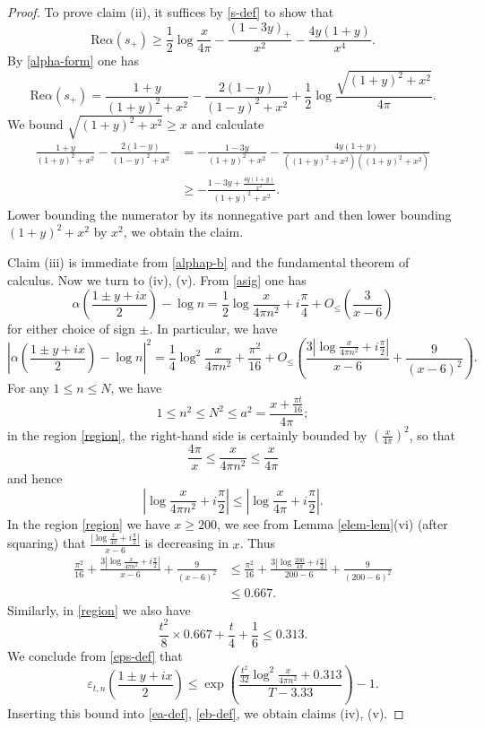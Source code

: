 \documentclass[a4paper,11pt,twoside]{amsart}
\newcommand\eps{\varepsilon}
\begin{document}
\begin{proof}
To prove claim (ii), it suffices by \eqref{s-def} to show that
$$ \mathrm{Re} \alpha(s_+) \geq \frac{1}{2} \log \frac{x}{4\pi} - \frac{(1-3y)_+}{x^2} - \frac{4y(1+y)}{x^4}.$$
By \eqref{alpha-form} one has
$$ \mathrm{Re} \alpha(s_+) = \frac{1+y}{(1+y)^2+x^2} - \frac{2(1-y)}{(1-y)^2+x^2} + \frac{1}{2} \log \frac{\sqrt{(1+y)^2+x^2}}{4\pi}.$$
We bound $\sqrt{(1+y)^2+x^2} \geq x$ and calculate
\begin{align*}
 \frac{1+y}{(1+y)^2+x^2} - \frac{2(1-y)}{(1-y)^2+x^2} &= - \frac{1-3y}{(1+y)^2+x^2} -\frac{4y(1+y)}{((1+y)^2+x^2)((1+y)^2+x^2)} \\
&\geq - \frac{1-3y+\frac{4y(1+y)}{x^2}}{(1+y)^2+x^2}.
\end{align*}
Lower bounding the numerator by its nonnegative part and then lower bounding $(1+y)^2+x^2$ by $x^2$, we obtain the claim.

Claim (iii) is immediate from \eqref{alphap-b} and the fundamental theorem of calculus.  Now we turn to (iv), (v).  From \eqref{asig} one has
$$ \alpha\left(\frac{1 \pm y + ix}{2}\right) - \log n = \frac{1}{2} \log \frac{x}{4\pi n^2} + i \frac{\pi}{4} + O_{\leq}\left( \frac{3}{x-6}\right)$$
for either choice of sign $\pm$.  In particular, we have
\begin{equation}\label{alphn}
 \left|\alpha\left(\frac{1 \pm y + ix}{2}\right) - \log n\right|^2 = \frac{1}{4} \log^2 \frac{x}{4\pi n^2} + \frac{\pi^2}{16} + 
O_{\leq}\left( \frac{3 |\log \frac{x}{4\pi n^2} + i \frac{\pi}{2}|}{x-6} + \frac{9}{(x-6)^2}\right).
\end{equation}
For any $1 \leq n \leq N$, we have
$$ 1 \leq n^2 \leq N^2 \leq a^2 = \frac{x+\frac{\pi t}{16}}{4\pi};$$
in the region \eqref{region}, the right-hand side is certainly bounded by $(\frac{x}{4\pi})^2$, so that
$$ \frac{4\pi}{x} \leq \frac{x}{4\pi n^2} \leq \frac{x}{4\pi}$$
and hence
$$ \left|\log \frac{x}{4\pi n^2} + i \frac{\pi}{2}\right| \leq \left|\log \frac{x}{4\pi} + i \frac{\pi}{2}\right|.$$
In the region \eqref{region} we have  $x \geq 200$, we see from Lemma \ref{elem-lem}(vi) (after squaring) that $\frac{|\log \frac{x}{4\pi} + i \frac{\pi}{2}|}{x-6}$ is decreasing in $x$.  Thus
\begin{align*}
\frac{\pi^2}{16} + \frac{3 |\log \frac{x}{4\pi n^2} + i \frac{\pi}{2}|}{x-6} + \frac{9}{(x-6)^2}
&\leq \frac{\pi^2}{16} +  \frac{3 |\log \frac{200}{4\pi} + i \frac{\pi}{2}|}{200-6} + \frac{9}{(200-6)^2} \\
&\leq 0.667.
\end{align*}
Similarly, in \eqref{region} we also have
$$ \frac{t^2}{8} \times 0.667 + \frac{t}{4} + \frac{1}{6} \leq 0.313.$$ 
We conclude from \eqref{eps-def} that
$$
\eps_{t,n}\left(\frac{1 \pm y + ix}{2} \right) \leq \exp\left( \frac{\frac{t^2}{32} \log^2 \frac{x}{4\pi n^2} + 0.313}{T-3.33} \right)-1.$$
Inserting this bound into \eqref{ea-def}, \eqref{eb-def}, we obtain claims (iv), (v).


\end{proof}
\end{document}
